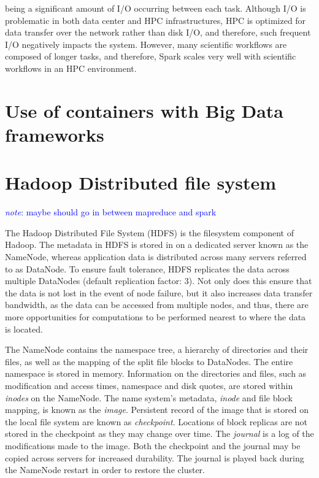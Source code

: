 \documentclass{report}
\newcommand{\note}[1]{\textcolor{blue}{\textit{note}: #1}}
\begin{document}
    being a significant amount of I/O occurring between each task. Although I/O
    is problematic in both data center and HPC infrastructures, HPC is optimized
    for data transfer over the network rather than disk I/O, and therefore, such
    frequent I/O negatively impacts the system. However, many scientific
    workflows are composed of longer tasks, and therefore, Spark scales very
    well with scientific workflows in an HPC environment.  \section{Use of
    containers with Big Data frameworks} \section{Hadoop Distributed file
    system} \note{maybe should go in between mapreduce and spark} 

        The Hadoop Distributed File System (HDFS)\cite{hadoop} is the filesystem
        component of Hadoop. The metadata in HDFS is stored in on a dedicated
        server known as the NameNode, whereas application data is distributed
        across many servers referred to as DataNode. To ensure fault tolerance,
        HDFS replicates the data across multiple DataNodes (default replication
        factor: 3). Not only does this ensure that the data is not lost in the
        event of node failure, but it also increases data transfer bandwidth, as
        the data can be accessed from multiple nodes, and thus, there are more
        opportunities for computations to be performed nearest to where the data
        is located. 

        The NameNode contains the namespace tree, a hierarchy of directories and
        their files, as well as the mapping of the split file blocks to
        DataNodes. The entire namespace is stored in memory. Information on the
        directories and files, such as modification and access times, namespace
        and disk quotes, are stored within \textit{inodes} on the NameNode.  The
        name system's metadata, \textit{inode} and file block mapping, is known
        as the \textit{image}. Persistent record of the image that is stored on
        the local file system are known as \textit{checkpoint}. Locations of
        block replicas are not stored in the checkpoint as they may change over
        time. The \textit{journal} is a log of the modifications made to the
        image. Both the checkpoint and the journal may be copied across servers
        for increased durability. The journal is played back during the NameNode
        restart in order to restore the cluster.
\end{document}

